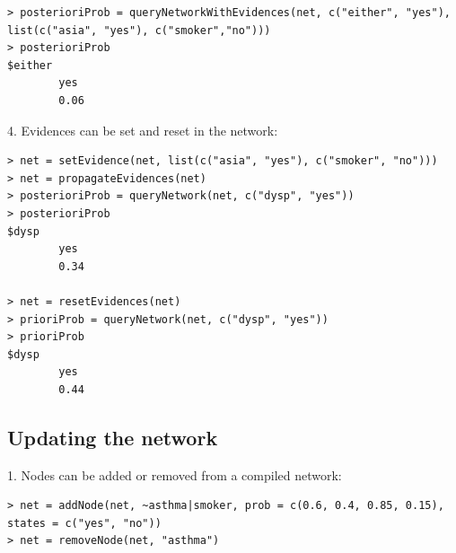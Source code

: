 \documentclass{article}
\begin{document}
\begin{verbatim}
> posterioriProb = queryNetworkWithEvidences(net, c("either", "yes"), list(c("asia", "yes"), c("smoker","no")))
> posterioriProb
$either
		yes
		0.06
\end{verbatim}


4. Evidences can be set and reset in the network:

\begin{verbatim}
> net = setEvidence(net, list(c("asia", "yes"), c("smoker", "no")))
> net = propagateEvidences(net)
> posterioriProb = queryNetwork(net, c("dysp", "yes"))
> posterioriProb
$dysp
		yes
		0.34

> net = resetEvidences(net)
> prioriProb = queryNetwork(net, c("dysp", "yes"))
> prioriProb
$dysp
		yes
		0.44

\end{verbatim}


\subsection{Updating the network}

1. Nodes can be added or removed from a compiled network:

\begin{verbatim}
> net = addNode(net, ~asthma|smoker, prob = c(0.6, 0.4, 0.85, 0.15), states = c("yes", "no"))
> net = removeNode(net, "asthma")
\end{verbatim}















\end{document}
